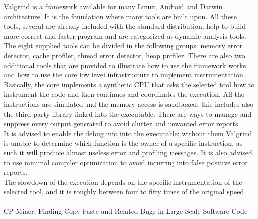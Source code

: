 Valgrind is a framework available for many Linux, Android and Darwin architecture. 
It is the foundation where many tools are built upon. All these tools, several are already included with the standard distribution, help to build more correct and faster program and are categorized as dynamic analysis tools.\\
The eight supplied tools can be divided in the following groups: memory error detector, cache profiler, thread error detector, heap profiler.
There are also two additional tools that are provided to illustrate how to use the framework works and how to use the core low level infrastructure to implement instrumentation.
\\ 
Basically, the core implements a synthetic CPU that asks the selected tool how to instrument the code and then continues and coordinates the execution. All the instructions are simulated and the memory access is sandboxed; this includes also the third party library linked into the executable. There are ways to manage and suppress every output generated to avoid clutter and unwanted error reports.
\\
It is advised to enable the debug info into the executable; without them Valgrind is unable to determine which function is the owner of a specific instruction, as such it will produce almost useless error and profiling messages. It is also advised to use minimal compiler optimization to avoid incurring into false positive error reports.
\\
The slowdown of the execution depends on the specific instrumentation of the selected tool, and it is roughly between four to fifty times of the original speed. 
\\
\\
 \cite{li2006cp} CP-Miner: Finding Copy-Paste and Related Bugs in Large-Scale Software Code

